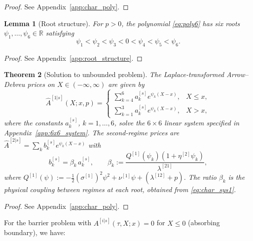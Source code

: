 \documentclass[11pt,a4paper]{article}
\numberwithin{equation}{section}
\newtheorem{theorem}{Theorem}[section]
\newtheorem{lemma}[theorem]{Lemma}
\newcommand{\R}{\mathbb{R}}
\begin{document}
\begin{proof}
See Appendix~\ref{app:char_poly}.
\end{proof}

\begin{lemma}[Root structure]\label{lem:root_structure}
For $p > 0$, the polynomial \eqref{eq:poly6} has six roots $\psi_1, \ldots, \psi_6 \in \R$ satisfying
\begin{equation}\label{eq:root_order}
\psi_1 < \psi_2 < \psi_3 < 0 < \psi_4 < \psi_5 < \psi_6.
\end{equation}
\end{lemma}

\begin{proof}
See Appendix~\ref{app:root_structure}.
\end{proof}


\begin{theorem}[Solution to unbounded problem]\label{thm:unbounded_solution}
The Laplace-transformed Arrow--Debreu prices on $X \in (-\infty, \infty)$ are given by
\begin{equation}\label{eq:unbounded_sol}
\hat{A}^{[1|s]}(X; x, p) = \begin{cases}
\sum_{k=4}^{6} a^{[s]}_k e^{\psi_k(X-x)}, & X \leq x, \\[4pt]
\sum_{k=1}^{3} a^{[s]}_k e^{\psi_k(X-x)}, & X > x,
\end{cases}
\end{equation}
where the constants $a^{[s]}_k$, $k = 1, \ldots, 6$, solve the $6 \times 6$ linear system specified in Appendix~\ref{app:6x6_system}. The second-regime prices are $\hat{A}^{[2|s]} = \sum_k b^{[s]}_k e^{\psi_k(X-x)}$ with
\begin{equation}\label{eq:physical_coupling}
b^{[s]}_k = \beta_k\, a^{[s]}_k, \qquad \beta_k := \frac{Q^{[1]}(\psi_k)(1 + \eta^{[2]}\psi_k)}{\lambda^{[21]}},
\end{equation}
where $Q^{[1]}(\psi) := -\tfrac{1}{2}(\sigma^{[1]})^2\psi^2 + \nu^{[1]}\psi + (\lambda^{[12]} + p)$. The ratio $\beta_k$ is the physical coupling between regimes at each root, obtained from \eqref{eq:char_sys1}.
\end{theorem}

\begin{proof}
See Appendix~\ref{app:char_poly}.
\end{proof}


For the barrier problem with $A^{[i|s]}(\tau, X; x) = 0$ for $X \leq 0$ (absorbing boundary), we have:
\end{document}
